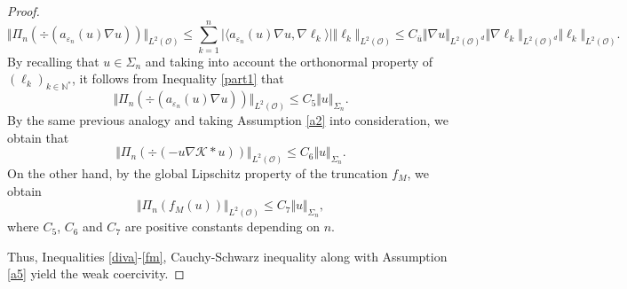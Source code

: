 \documentclass[10pt,number,preprint,times]{elsarticle}
\numberwithin{equation}{section} %
\begin{document}
\begin{proof}
\begin{equation}\label{part1}
\Vert \Pi_n\left(\div\left(a_{\varepsilon_n}(u) \nabla u\right)\right)\Vert_{L^2(\mathcal{O})}\leq \sum_{k=1}^n \vert \langle a_{\varepsilon_n}(u) \nabla u,\nabla \ell_k\rangle \vert \Vert \ell_k \Vert_{L^2(\mathcal{O})} \leq C_{\overline{u}} \Vert \nabla u \Vert_{L^2(\mathcal{O})^d} \Vert \nabla \ell_k \Vert_{L^2(\mathcal{O})^d} \Vert \ell_k \Vert_{L^2(\mathcal{O})}.
\end{equation}
By recalling that $u \in \Sigma_n$ and taking into account the orthonormal property of $\left(\ell_k\right)_{k \in \mathbb{N}^*}$, it follows from Inequality \eqref{part1} that
\begin{equation}\label{diva}
	\Vert \Pi_n\left(\div\left(a_{\varepsilon_n}(u) \nabla u\right)\right)\Vert_{L^2(\mathcal{O})}\leq C_{5} \Vert u \Vert_{\Sigma_n}.
\end{equation}
By the same previous analogy and taking  Assumption \ref{a2} into consideration, we obtain that  
\begin{equation}\label{divK}
	\Vert \Pi_n\left(\div\left(-u\nabla \mathcal{K} \ast u\right)\right)\Vert_{L^2(\mathcal{O})}\leq C_{6} \Vert u \Vert_{\Sigma_n}.
\end{equation}
On the other hand, by the global Lipschitz property of the truncation $f_M$, we obtain
\begin{equation}\label{fm}
	\Vert \Pi_n\left(f_M(u)\right)\Vert_{L^2(\mathcal{O})}\leq C_{7} \Vert u \Vert_{\Sigma_n},
\end{equation}
where $C_5$, $C_6$ and $C_7$ are positive constants depending on $n$.


\noindent
Thus, Inequalities \eqref{diva}-\eqref{fm}, Cauchy-Schwarz inequality along with Assumption \ref{a5} yield the weak coercivity.


\end{proof}
\end{document}
